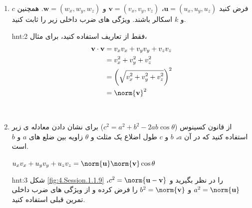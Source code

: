 {\begin{spacing}{1.5}
\begin{enumerate}[label=\textbf{\arabic*}.]
            \item {فرض کنید $\textbf{u}=(u_{x},u_{y},u_{z})$، $\textbf{v}=(v_{x},v_{y},v_{z})$ و $\textbf{w}=(w_{x},w_{y},w_{z})$. همچنین $c$ و $k$ اسکالر باشند. ویژگی های ضرب داخلی زیر را ثابت کنید.}
            \begin{flushleft}
            \end{flushleft}
            \begin{hint}{hnt:2}
                \Large
                فقط از تعاریف استفاده کنید، برای مثال،
                \begin{equation*}
                    \centering
                    \begin{split}
                        \textbf{v}\cdot\textbf{v}&=v_{x}v_{x}+v_{y}v_{y}+v_{z}v_{z} \\
                        &=v_{x}^2+v_{y}^2+v_{z}^2 \\
                        &=\left( \sqrt{\displaystyle v_{x}^2+v_{y}^2+v_{z}^2} \right)^2 \\
                        &=\norm{\textbf{v}}^2
                    \end{split}
                \end{equation*}
            \end{hint}
            \\
            \item \label{question10} {از قانون کسینوس ($c^2=a^2+b^2-2ab\cos\theta$) برای نشان دادن معادله ی زیر استفاده کنید که در آن $a$، $b$ و $c$ طول اضلاع یک مثلث و $\theta$ زاویه بین ضلع های $a$ و $b$ است.}
            \begin{center}
                $u_{x}v_{x}+u_{y}v_{y}+u_{z}v_{z}=\norm{\textbf{u}}\norm{\textbf{v}}\cos\theta$
            \end{center}
            \begin{hint}{hnt:3}
                \Large
                شکل \ref{fig:4.Session.1.1.9} را در نظر بگیرید و $c^2=\norm{\textbf{u}-\textbf{v}}$، $a^2=\norm{\textbf{u}}$ و $b^2=\norm{\textbf{v}}$ را فرض کرده و از ویژگی های ضرب داخلی تمرین قبلی استفاده کنید.

\end{hint}
\end{enumerate}
\end{spacing}}
